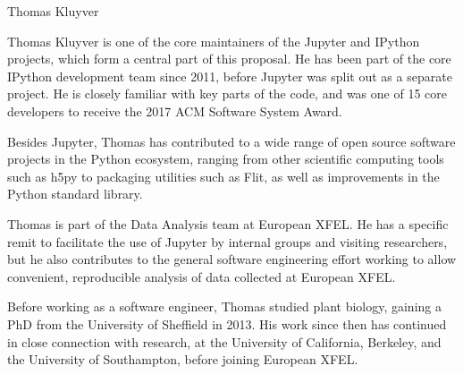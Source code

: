 \begin{participant}[type=R,PM=1,gender=male]{Thomas Kluyver}

  Thomas Kluyver is one of the core maintainers of the Jupyter and IPython
  projects, which form a central part of this proposal.
  He has been part of the core IPython development team since 2011,
  before Jupyter was split out as a separate project.
  He is closely familiar with key parts of the code, and was one of
  15 core developers to receive the 2017 ACM Software System Award.

  Besides Jupyter, Thomas has contributed to a wide range of open source
  software projects in the Python ecosystem, ranging from other scientific
  computing tools such as h5py to packaging utilities such as Flit, as well
  as improvements in the Python standard library.
  
  Thomas is part of the Data Analysis team at European XFEL.
  He has a specific remit to facilitate the use of Jupyter by internal groups
  and visiting researchers,
  but he also contributes to the general software engineering effort working to
  allow convenient, reproducible analysis of data collected at European XFEL.

  Before working as a software engineer, Thomas studied plant biology, gaining
  a PhD from the University of Sheffield in 2013. His work since then has
  continued in close connection with research, at the University of California,
  Berkeley, and the University of Southampton, before joining European XFEL.
\end{participant}

